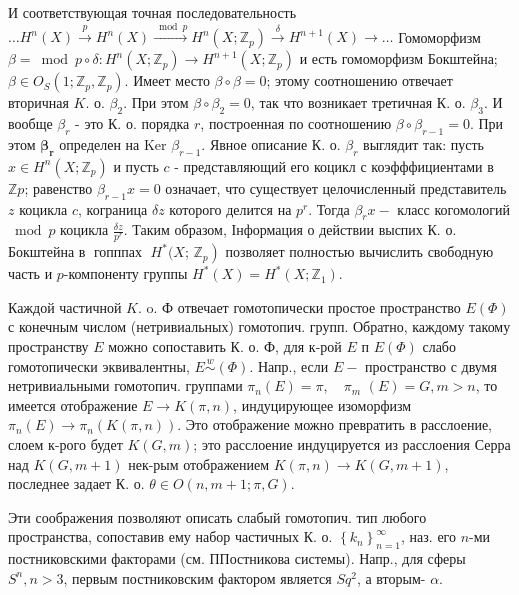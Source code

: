 \documentclass[10pt]{article}
\begin{document}
И соответствующая точная последовательность $\ldots H^{n}(X) \stackrel{p}{\longrightarrow} H^{n}(X) \stackrel{\bmod p}{\longrightarrow} H^{n}\left(X ; \mathbb{Z}_{p}\right) \stackrel{\delta}{\longrightarrow} H^{n+1}(X) \longrightarrow \ldots$ Гомоморфизм $\beta=\bmod p \circ \delta: H^{n}\left(X ; \mathbb{Z}_{p}\right) \rightarrow H^{n+1}\left(X ; \mathbb{Z}_{p}\right)$ и есть гомоморфизм Бокштейна; $\beta \in O_{S}\left(1 ; \mathbb{Z}_{p}, \mathbb{Z}_{p}\right)$. Имеет место $\beta \circ \beta=0$; этому соотношению отвечает вторичная $K$. о. $\beta_{2}$. При этом $\beta \circ \beta_{2}=0$, так что возникает третичная К. о. $\beta_{3}$. И вообще $\beta_{r}$ - это К. о. порядка $r$, построенная по соотношению $\beta \circ \beta_{r-1}=0$. При этом $\boldsymbol{\beta}_{\boldsymbol{r}}$ определен на Ker $\beta_{r-1}$. Явное описание К. о. $\beta_{r}$ выглядит так: пусть $x \in H^{n}\left(X ; \mathbb{Z}_{p}\right)$ и пусть $c$ - представляющий его коцикл с коэфффициентами в $\mathbb{Z} p$; равенство $\beta_{r-1} x=0$ означает, что существует целочисленный представитель $z$ коцикла $c$, кограница $\delta z$ которого делится на $p^{r}$. Тогда $\beta_{r} x-$ класс когомологий $\bmod p$ коцикла $\frac{\delta z}{p^{r}}$. Таким образом, Інформация о действии выспих К. о. Бокштейна в $\operatorname{гопппах~} H^{*}(X$; $\left.\mathbb{Z}_{p}\right)$ позволяет полностью вычислить свободную часть и $p$-компоненту группы $H^{*}(X)=H^{*}\left(X ; \mathbb{Z}_{1}\right)$.



Каждой частичной $K$. o. Ф отвечает гомотопически простое пространство $E(\Phi)$ с конечным числом (нетривиальных) гомотопич. групп. Обратно, каждому такому пространству $E$ можно сопоставить К. о. Ф, для к-рой $E$ п $E(\Phi)$ слабо гомотопически эквивалентны, $E \stackrel{w}{\sim}(\Phi)$. Напр., если $E-$ пространство с двумя нетривиальными гомотопич. группами $\pi_{n}(E)=\pi, \quad \pi_{m}$ $(E)=G, m>n$, то имеется отображение $E \rightarrow K(\pi, n)$, индуцирующее изоморфизм $\pi_{n}(E) \rightarrow \pi_{n}(K(\pi, n))$. Это отображение можно превратить в расслоение, слоем к-рого будет $K(G, m)$; это расслоение индуцируется из расслоения Серра над $K(G, m+1)$ нек-рым отображением $K(\pi, n) \rightarrow K(G, m+1)$, последнее задает К. о. $\theta \in O(n, m+1 ; \pi, G)$.



Эти соображения позволяют описать слабый гомотопич. тип любого пространства, сопоставив ему набор частичных К. о. $\left\{k_{n}\right\}_{n=1}^{\infty}$, наз. его $n$-ми постниковскими факторами (см. ППостникова системы). Напр., для сферы $S^{n}, n>3$, первым постниковским фактором является $S q^{2}$, а вторым- $\alpha$.
\end{document}
